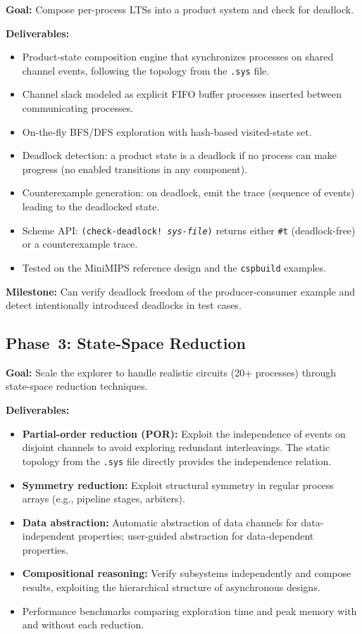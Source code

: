 \documentclass[11pt]{article}
\begin{document}
\textbf{Goal:} Compose per-process LTSs into a product system and
check for deadlock.

\textbf{Deliverables:}
\begin{itemize}
\item Product-state composition engine that synchronizes processes on
  shared channel events, following the topology from the \texttt{.sys}
  file.
\item Channel slack modeled as explicit FIFO buffer processes inserted
  between communicating processes.
\item On-the-fly BFS/DFS exploration with hash-based visited-state
  set.
\item Deadlock detection: a product state is a deadlock if no process
  can make progress (no enabled transitions in any component).
\item Counterexample generation: on deadlock, emit the trace
  (sequence of events) leading to the deadlocked state.
\item Scheme API: \texttt{(check-deadlock! \textit{sys-file})} returns
  either \texttt{\#t} (deadlock-free) or a counterexample trace.
\item Tested on the MiniMIPS reference design and the
  \texttt{cspbuild} examples.
\end{itemize}

\textbf{Milestone:} Can verify deadlock freedom of the producer-consumer
example and detect intentionally introduced deadlocks in test cases.

\subsection{Phase~3: State-Space Reduction}

\textbf{Goal:} Scale the explorer to handle realistic circuits
(20+ processes) through state-space reduction techniques.

\textbf{Deliverables:}
\begin{itemize}
\item \textbf{Partial-order reduction (POR):} Exploit the independence
  of events on disjoint channels to avoid exploring redundant
  interleavings.  The static topology from the \texttt{.sys} file
  directly provides the independence relation.
\item \textbf{Symmetry reduction:} Exploit structural symmetry in
  regular process arrays (e.g., pipeline stages, arbiters).
\item \textbf{Data abstraction:} Automatic abstraction of data
  channels for data-independent properties; user-guided abstraction
  for data-dependent properties.
\item \textbf{Compositional reasoning:} Verify subsystems independently
  and compose results, exploiting the hierarchical structure of
  asynchronous designs.
\item Performance benchmarks comparing exploration time and peak
  memory with and without each reduction.
\end{itemize}
\end{document}
